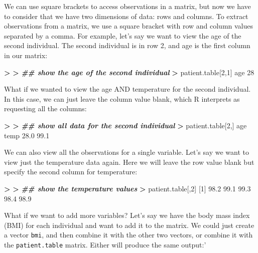 \documentclass[
]{book}
\newenvironment{Shaded}{\begin{snugshade}}{\end{snugshade}}
\newcommand{\DecValTok}[1]{\textcolor[rgb]{0.00,0.00,0.81}{#1}}
\newcommand{\DocumentationTok}[1]{\textcolor[rgb]{0.56,0.35,0.01}{\textbf{\textit{#1}}}}
\newcommand{\ErrorTok}[1]{\textcolor[rgb]{0.64,0.00,0.00}{\textbf{#1}}}
\newcommand{\FloatTok}[1]{\textcolor[rgb]{0.00,0.00,0.81}{#1}}
\newcommand{\NormalTok}[1]{#1}
\newcommand{\SpecialCharTok}[1]{\textcolor[rgb]{0.81,0.36,0.00}{\textbf{#1}}}
\begin{document}
We can use square brackets to access observations in a matrix, but now we have to consider that we have two dimensions of data: rows and columns. To extract observations from a matrix, we use a square bracket with row and column values separated by a comma. For example, let's say we want to view the age of the second individual. The second individual is in row 2, and age is the first column in our matrix:

\begin{Shaded}
\begin{Highlighting}[]
\SpecialCharTok{\textgreater{}} 
\ErrorTok{\textgreater{}} \DocumentationTok{\#\# show the age of the second individual}
\ErrorTok{\textgreater{}}\NormalTok{ patient.table[}\DecValTok{2}\NormalTok{,}\DecValTok{1}\NormalTok{]}
\NormalTok{age }
 \DecValTok{28} 
\end{Highlighting}
\end{Shaded}

What if we wanted to view the age AND temperature for the second individual. In this case, we can just leave the column value blank, which R interprets as requesting all the columns:

\begin{Shaded}
\begin{Highlighting}[]
\SpecialCharTok{\textgreater{}} 
\ErrorTok{\textgreater{}} \DocumentationTok{\#\# show all data for the second individual}
\ErrorTok{\textgreater{}}\NormalTok{ patient.table[}\DecValTok{2}\NormalTok{,]}
\NormalTok{ age temp }
\FloatTok{28.0} \FloatTok{99.1} 
\end{Highlighting}
\end{Shaded}

We can also view all the observations for a single variable. Let's say we want to view just the temperature data again. Here we will leave the row value blank but specify the second column for temperature:

\begin{Shaded}
\begin{Highlighting}[]
\SpecialCharTok{\textgreater{}} 
\ErrorTok{\textgreater{}} \DocumentationTok{\#\# show the temperature values}
\ErrorTok{\textgreater{}}\NormalTok{ patient.table[,}\DecValTok{2}\NormalTok{]}
\NormalTok{[}\DecValTok{1}\NormalTok{] }\FloatTok{98.2} \FloatTok{99.1} \FloatTok{99.3} \FloatTok{98.4} \FloatTok{98.9}
\end{Highlighting}
\end{Shaded}

What if we want to add more variables? Let's say we have the body mass index (BMI) for each individual and want to add it to the matrix. We could just create a vector \texttt{bmi}, and then combine it with the other two vectors, or combine it with the \texttt{patient.table} matrix. Either will produce the same output:'
\end{document}
